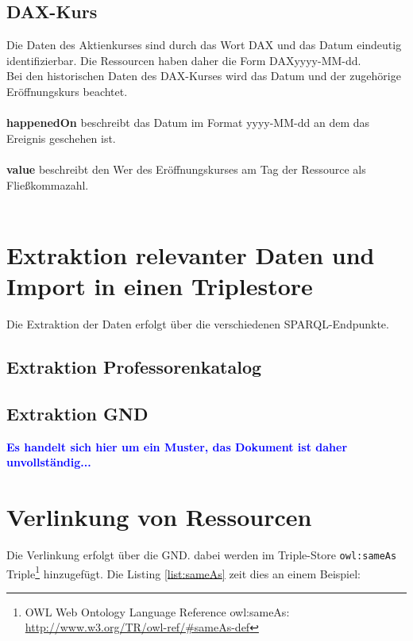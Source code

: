 \documentclass[a4paper,10pt,parskip]{article}
\begin{document}
\subsection{DAX-Kurs}
Die Daten des Aktienkurses sind durch das Wort DAX und das Datum eindeutig identifizierbar. Die Ressourcen haben daher die Form DAXyyyy-MM-dd.\\
Bei den historischen Daten des DAX-Kurses wird das Datum und der zugehörige Eröffnungskurs beachtet.\\
\\
\textbf{happenedOn} beschreibt das Datum im Format yyyy-MM-dd an dem das Ereignis geschehen ist.\\
\\
\textbf{value} beschreibt den Wer des Eröffnungskurses am Tag der Ressource als Fließkommazahl.\\
\\



\section{Extraktion relevanter Daten und Import in einen Triplestore }

Die Extraktion der Daten erfolgt über die verschiedenen SPARQL-Endpunkte.

\subsection{Extraktion Professorenkatalog}

\subsection{Extraktion GND}


\vspace{0.5cm}\textcolor{blue}{\textbf{Es handelt sich hier um ein Muster, das Dokument ist daher unvollständig...}}

\section{Verlinkung von Ressourcen}

Die Verlinkung erfolgt über die GND. dabei werden im Triple-Store \verb+owl:sameAs+ Triple\footnote{OWL Web Ontology Language Reference owl:sameAs: \url{http://www.w3.org/TR/owl-ref/\#sameAs-def}} hinzugefügt. Die Listing \ref{list:sameAs} zeit dies an einem Beispiel:
\end{document}
